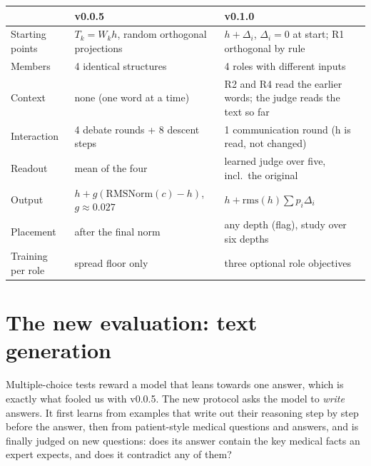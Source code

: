 \documentclass[a4paper,12pt,parskip=half,headsepline]{scrartcl}
\begin{document}
\begin{center}
\begin{tabularx}{\linewidth}{@{}p{3.0cm}YY@{}}
\toprule
 & \textbf{v0.0.5} & \textbf{v0.1.0}\\
\midrule
Starting points & $T_k = W_k h$, random orthogonal projections & $h + \Delta_i$, $\Delta_i = 0$ at start; R1 orthogonal by rule\\
Members & 4 identical structures & 4 roles with different inputs\\
Context & none (one word at a time) & R2 and R4 read the earlier words; the judge reads the text so far\\
Interaction & 4 debate rounds + 8 descent steps & 1 communication round (h is read, not changed)\\
Readout & mean of the four & learned judge over five, incl.\ the original\\
Output & $h + g(\text{RMSNorm}(c) - h)$, $g \approx 0.027$ & $h + \text{rms}(h)\sum p_i\Delta_i$\\
Placement & after the final norm & any depth (flag), study over six depths\\
Training per role & spread floor only & three optional role objectives\\
\bottomrule
\end{tabularx}
\end{center}

\section{The new evaluation: text generation}

\begin{plain}
Multiple-choice tests reward a model that leans towards one answer, which is
exactly what fooled us with v0.0.5. The new protocol asks the model to \emph{write}
answers. It first learns from examples that write out their reasoning step by step
before the answer, then from patient-style medical questions and answers, and is
finally judged on new questions: does its answer contain the key medical facts an
expert expects, and does it contradict any of them?
\end{plain}
\end{document}
